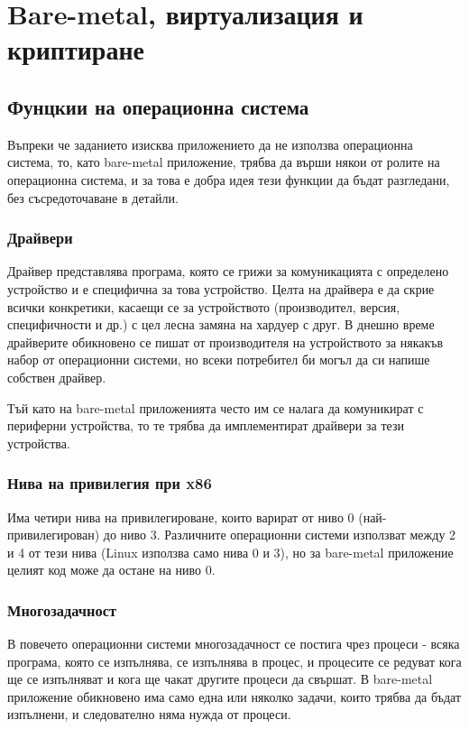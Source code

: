 \chapter{Bare-metal, виртуализация и криптиране}
\hfill
\section{Фунцкии на операционна система}
Въпреки че заданието изисква приложението да не използва операционна система, то, като bare-metal приложение, трябва да върши някои от ролите на операционна система, и за това е добра идея тези функции да бъдат разгледани, без съсредоточаване в детайли.
  \subsection{Драйвери}
  Драйвер представлява програма, която се грижи за комуникацията с определено устройство и е специфична за това устройство. Целта на драйвера е да скрие всички конкретики, касаещи се за устройството (производител, версия, специфичности и др.) с цел лесна замяна на хардуер с друг. В днешно време драйверите обикновено се пишат от производителя на устройството за някакъв набор от операционни системи, но всеки потребител би могъл да си напише собствен драйвер.

  Тъй като на bare-metal приложенията често им се налага да комуникират с периферни устройства, то те трябва да имплементират драйвери за тези устройства.

  \subsection{Нива на привилегия при x86} \label{rings}
  Има четири нива на привилегироване, които варират от ниво 0 (най-приви\-ле\-ги\-рован) до ниво 3.\cite[глава~6.4.5]{intel-manual-1} Различните операционни системи използват между 2 и 4 от тези нива (Linux използва само нива 0 и 3), но за bare-metal приложение целият код може да остане на ниво 0.

  \subsection{Многозадачност}
  В повечето операционни системи многозадачност се постига чрез процеси - всяка програма, която се изпълнява, се изпълнява в процес, и процесите се редуват кога ще се изпълняват и кога ще чакат другите процеси да свършат. В bare-metal приложение обикновено има само една или няколко задачи, които трябва да бъдат изпълнени, и следователно няма нужда от процеси.

